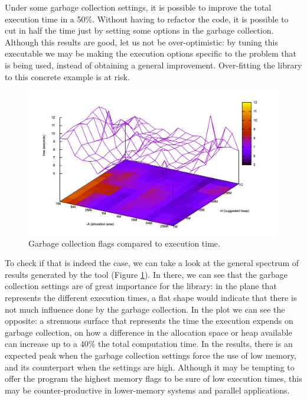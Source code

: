 Under some garbage collection settings, it is possible to improve the total
execution time in a 50\%. Without having to refactor the code, it is possible
to cut in half the time just by setting some options in the garbage collection.
Although this results are good, let us not be over-optimistic: by tuning this
executable we may be making the execution options specific to the problem that
is being used, instead of obtaining a general improvement. Over-fitting the
library to this concrete example is at risk.\\

\begin{figure}[ht]
\centering
\includegraphics[width=\textwidth]{img/gc-tuning.png}
\caption{Garbage collection flags compared to execution time.}
\label{gc-tuning}
\end{figure}

To check if that is indeed the case, we can take a look at the general spectrum
of results generated by the tool (Figure \ref{gc-tuning}). In there, we can see
that the garbage collection settings are of great importance for the library:
in the plane that represents the different execution times, a flat shape would
indicate that there is not much influence done by the garbage collection. In
the plot we can see the opposite: a strenuous surface that represents the time
the execution expends on garbage collection, on how a difference in the
allocation space or heap available can increase up to a 40\% the total
computation time. In the results, there is an expected peak when the garbage
collection settings force the use of low memory, and its counterpart when the
settings are high. Although it may be tempting to offer the program the highest
memory flags to be sure of low execution times, this may be counter-productive
in lower-memory systems and parallel applications.\\

